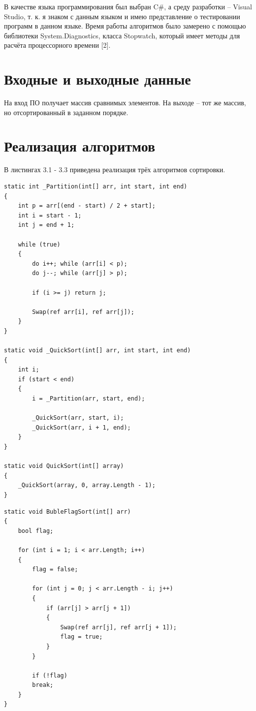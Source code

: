 \documentclass[12pt]{report}
\begin{document}
В качестве языка программирования был выбран C\#, а среду разработки -- Visual Studio, т. к. я знаком с данным языком и имею представление о тестировании программ в данном языке. Время работы алгоритмов было замерено с помощью библиотеки System.Diagnostics, класса Stopwatch, который имеет методы для расчёта процессорного времени [2].

\section{Входные и выходные данные}
На вход ПО получает массив сравнимых элементов. На выходе -- тот же массив, но отсортированный в заданном порядке.

\section{Реализация алгоритмов}

В листингах 3.1 - 3.3 приведена реализация трёх алгоритмов сортировки.

\begin{lstlisting}[label=some-code,caption=Функция быстрой сортировки]
static int _Partition(int[] arr, int start, int end)
{
	int p = arr[(end - start) / 2 + start];
	int i = start - 1;
	int j = end + 1;
	
	while (true)
	{
		do i++; while (arr[i] < p);
		do j--; while (arr[j] > p);
		
		if (i >= j) return j;
		
		Swap(ref arr[i], ref arr[j]);
	}
}

static void _QuickSort(int[] arr, int start, int end)
{
	int i;
	if (start < end)
	{
		i = _Partition(arr, start, end);
		
		_QuickSort(arr, start, i);
		_QuickSort(arr, i + 1, end);
	}
}

static void QuickSort(int[] array)
{
	_QuickSort(array, 0, array.Length - 1);
}
\end{lstlisting}

\begin{lstlisting}[label=some-code,caption=Функция сортировки массива пузырьком с флагом]
static void BubleFlagSort(int[] arr)
{
	bool flag;
	
	for (int i = 1; i < arr.Length; i++)
	{
		flag = false;
		
		for (int j = 0; j < arr.Length - i; j++)
		{
			if (arr[j] > arr[j + 1])
			{
				Swap(ref arr[j], ref arr[j + 1]);
				flag = true;
			}
		}
		
		if (!flag)
		break;
	}
}
\end{lstlisting}
\end{document}
